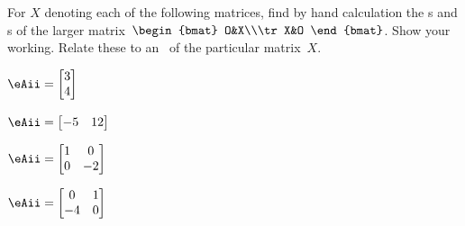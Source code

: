\begin{exercise}  
For \(X\) denoting each of the following matrices, find by hand calculation the s and s of the larger matrix~\(\begin{bmat} O&X\\\tr X&O \end{bmat}\).
Show your working.
Relate these to an \svd\ of the particular matrix~\(X\).
\begin{Parts}
\item \(\eAii=\begin{bmatrix} 3\\4 \end{bmatrix}\)

\item \(\eAii=\begin{bmatrix} -5&12 \end{bmatrix}\)

\item \(\eAii=\begin{bmatrix} 1&0\\0&-2 \end{bmatrix}\)

\item \(\eAii=\begin{bmatrix} 0&1\\-4&0 \end{bmatrix}\)

\end{Parts}
\end{exercise}





